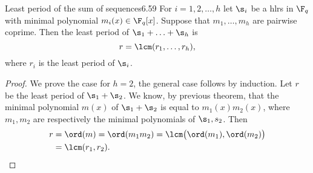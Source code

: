 \begin{teor}{Least period of the sum of sequences}{6.59}
	For \(i=1,2,\ldots,h\) let \(\s_i\) be a hlrs in \(\F_q\) with minimal polynomial \(m_i(x)\in\F_q[x]\).
	Suppose that \(m_1,\ldots,m_h\) are pairwise coprime. Then the least period of \(\s_1+\ldots+\s_h\) is
	\[
		r=\lcm(r_1,\ldots,r_h),
	\]
	where \(r_i\) is the least period of \(\s_i\).
\end{teor}

\begin{proof}
	We prove the case for \(h=2\), the general case follows by induction.
	Let \(r\) be the least period of \(\s_1+\s_2\). We know, by previous theorem, that the minimal polynomial \(m(x)\) of \(\s_1+\s_2\) is equal to \(m_1(x)m_2(x)\), where \(m_1,m_2\) are respectively the minimal polynomials of \(\s_1,s_2\). Then
	\begin{align*}
		r & = \ord(m) = \ord(m_1 m_2) = \lcm\big(\ord(m_1),\ord(m_2)\big) \\
		  & = \lcm(r_1,r_2).\qedhere
	\end{align*}
\end{proof}

